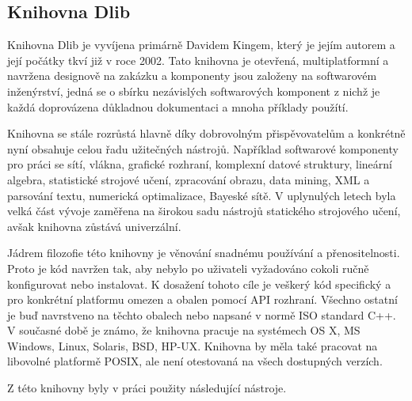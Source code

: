 \subsection{Knihovna Dlib}
Knihovna Dlib je vyvíjena primárně Davidem Kingem, který je jejím autorem a její počátky tkví již v roce 2002. Tato knihovna je otevřená, multiplatformní a navržena designově na zakázku a komponenty jsou založeny na softwarovém inženýrství, jedná se o sbírku nezávislých softwarových komponent z nichž je každá doprovázena důkladnou dokumentaci a mnoha příklady použítí.

Knihovna se stále rozrůstá hlavně díky dobrovolným přispěvovatelům a konkrétně nyní obsahuje celou řadu užitečných nástrojů. Například softwarové komponenty pro práci se sítí, vlákna, grafické rozhraní, komplexní datové struktury, lineární algebra, statistické strojové učení, zpracování obrazu, data mining, XML a parsování textu, numerická optimalizace, Bayeské sítě. V uplynulých letech byla velká část vývoje zaměřena na širokou sadu nástrojů statického strojového učení, avšak knihovna zůstává univerzální.  

Jádrem filozofie této knihovny je věnování snadnému používání a přenositelnosti. Proto je kód navržen tak, aby nebylo po uživateli vyžadováno cokoli ručně konfigurovat nebo instalovat. K dosažení tohoto cíle je veškerý kód specifický a pro konkrétní platformu omezen a obalen pomocí API rozhraní. Všechno ostatní je buď navrstveno na těchto obalech nebo napsané v normě ISO standard C++. V současné době je známo, že knihovna pracuje na systémech OS X, MS Windows, Linux, Solaris, BSD, HP-UX. Knihovna by měla také pracovat na libovolné platformě POSIX, ale není otestovaná na všech dostupných verzích. 

Z této knihovny byly v práci použity následující nástroje.
